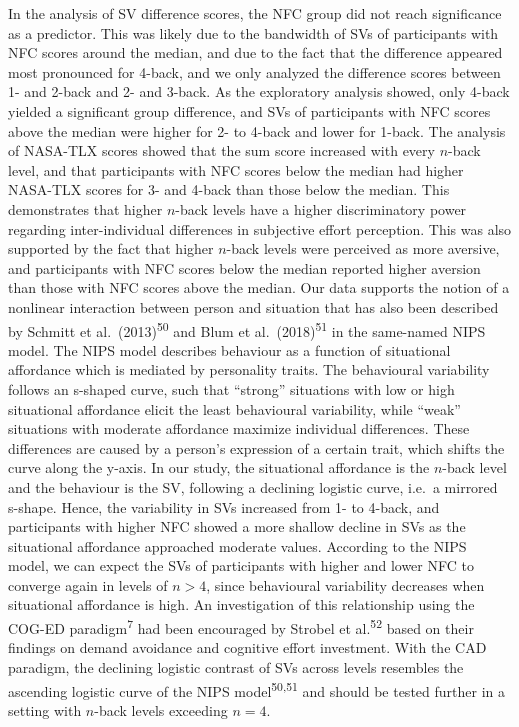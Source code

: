 \documentclass[
  man,floatsintext]{apa6}
\begin{document}
In the analysis of SV difference scores, the NFC group did not reach significance as a predictor.
This was likely due to the bandwidth of SVs of participants with NFC scores around the median, and due to the fact that the difference appeared most pronounced for 4-back, and we only analyzed the difference scores between 1- and 2-back and 2- and 3-back.
As the exploratory analysis showed, only 4-back yielded a significant group difference, and SVs of participants with NFC scores above the median were higher for 2- to 4-back and lower for 1-back.
The analysis of NASA-TLX scores showed that the sum score increased with every \(n\)-back level, and that participants with NFC scores below the median had higher NASA-TLX scores for 3- and 4-back than those below the median.
This demonstrates that higher \(n\)-back levels have a higher discriminatory power regarding inter-individual differences in subjective effort perception.
This was also supported by the fact that higher \(n\)-back levels were perceived as more aversive, and participants with NFC scores below the median reported higher aversion than those with NFC scores above the median.
Our data supports the notion of a nonlinear interaction between person and situation that has also been described by Schmitt et al.~(2013)\textsuperscript{50} and Blum et al.~(2018)\textsuperscript{51} in the same-named NIPS model.
The NIPS model describes behaviour as a function of situational affordance which is mediated by personality traits.
The behavioural variability follows an s-shaped curve, such that ``strong'' situations with low or high situational affordance elicit the least behavioural variability, while ``weak'' situations with moderate affordance maximize individual differences.
These differences are caused by a person's expression of a certain trait, which shifts the curve along the y-axis.
In our study, the situational affordance is the \(n\)-back level and the behaviour is the SV, following a declining logistic curve, i.e.~a mirrored s-shape.
Hence, the variability in SVs increased from 1- to 4-back, and participants with higher NFC showed a more shallow decline in SVs as the situational affordance approached moderate values.
According to the NIPS model, we can expect the SVs of participants with higher and lower NFC to converge again in levels of \(n>4\), since behavioural variability decreases when situational affordance is high.
An investigation of this relationship using the COG-ED paradigm\textsuperscript{7} had been encouraged by Strobel et al.\textsuperscript{52} based on their findings on demand avoidance and cognitive effort investment.
With the CAD paradigm, the declining logistic contrast of SVs across levels resembles the ascending logistic curve of the NIPS model\textsuperscript{50,51} and should be tested further in a setting with \(n\)-back levels exceeding \(n=4\).
\end{document}
